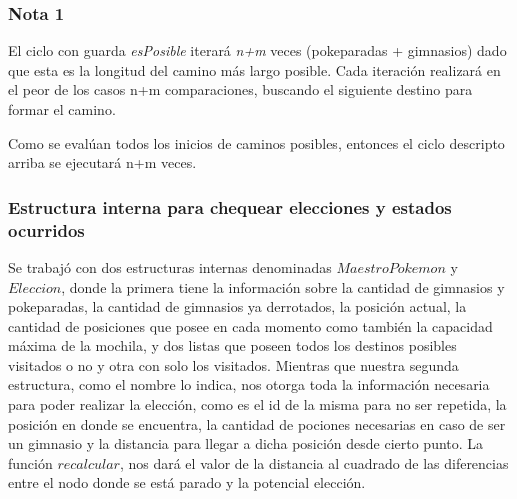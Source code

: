 \subsubsection{Nota 1}
El ciclo con guarda \textit{esPosible} iterará \textit{n+m} veces (pokeparadas + gimnasios) dado que esta es la longitud del camino más largo posible. Cada iteración realizará en el peor de los casos n+m comparaciones, buscando el siguiente destino para formar el camino.

Como se evalúan todos los inicios de caminos posibles, entonces el ciclo descripto arriba se ejecutará n+m veces.

\subsubsection{Estructura interna para chequear elecciones y estados ocurridos}

Se trabajó con dos estructuras internas denominadas $MaestroPokemon$ y $Eleccion$, donde la primera tiene la informaci\'on sobre la cantidad de gimnasios y pokeparadas, la cantidad de gimnasios ya derrotados, la posici\'on actual, la cantidad de posiciones que posee en cada momento como tambi\'en la capacidad m\'axima de la mochila, y dos listas que poseen todos los destinos posibles visitados o no y otra con solo los visitados.
Mientras que nuestra segunda estructura, como el nombre lo indica, nos otorga toda la informaci\'on necesaria para poder realizar la elecci\'on, como es el id de la misma para no ser repetida, la posici\'on en donde se encuentra, la cantidad de pociones necesarias en caso de ser un gimnasio y la distancia para llegar a dicha posici\'on desde cierto punto.
La funci\'on $recalcular$, nos dar\'a el valor de la distancia al cuadrado de las diferencias entre el nodo donde se está parado y la potencial elección.

